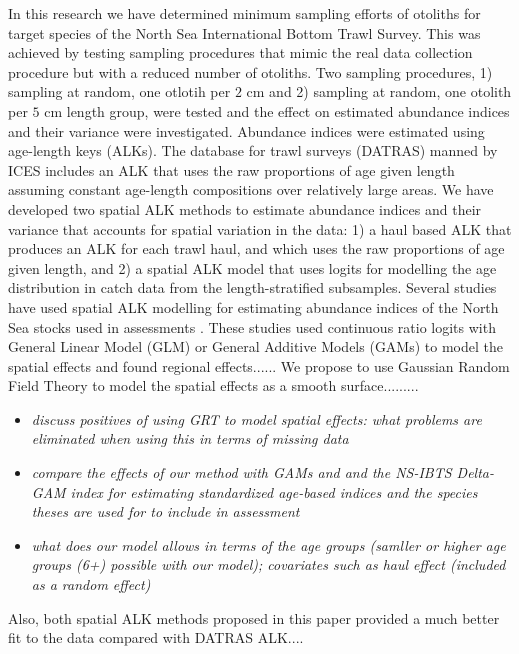 \documentclass[a4paper 12pt]{article}
\numberwithin{equation}{section}
\begin{document}
In this research we have determined minimum sampling efforts of otoliths for target species of the North Sea International Bottom Trawl Survey. This was achieved by testing sampling procedures that mimic the real data collection procedure but with a reduced number of otoliths. Two sampling procedures, 1) sampling at random, one otlotih per $2$ cm and 2) sampling at random, one otolith per $5$ cm length group, were tested and the effect on estimated abundance indices and their variance were investigated. Abundance indices were estimated using age-length keys (ALKs). The database for trawl surveys (DATRAS) manned by ICES includes an ALK that uses the raw proportions of age given length assuming constant age-length compositions over relatively large areas. We have developed two spatial ALK methods  to estimate abundance indices and their variance that accounts for spatial variation in the data: 1) a haul based ALK that produces an ALK for each trawl haul, and which uses the raw proportions of age given length, and 2) a spatial ALK model that uses logits for modelling the age distribution in catch data from the length-stratified  subsamples. Several studies have used spatial ALK modelling for estimating abundance indices of the North Sea stocks used in  assessments \citep{berg2012spatial, berg2014evaluation, gerritsen2006simple}. These studies used continuous ratio logits with General Linear Model (GLM) or General Additive Models (GAMs) to model the spatial effects and found regional effects...... We propose to use Gaussian Random Field Theory to model the spatial effects as a smooth surface.........
\begin{itemize}
\item \emph{discuss positives of using GRT to model spatial effects: what problems are eliminated when using this in terms of missing data}
\item \emph{compare the effects of our method with GAMs \citep{berg2012spatial} and \citep{berg2014evaluation} and the NS-IBTS Delta-GAM index for estimating standardized age-based indices and the species theses are used for to include in assessment}
\item \emph{what does our model allows in terms of the age groups (samller or higher age groups (6+) possible with our model); covariates such as haul effect (included as a random effect)}
\end{itemize}

Also, both spatial ALK methods proposed in this paper provided a much better fit to the data compared with DATRAS ALK....
\end{document}
